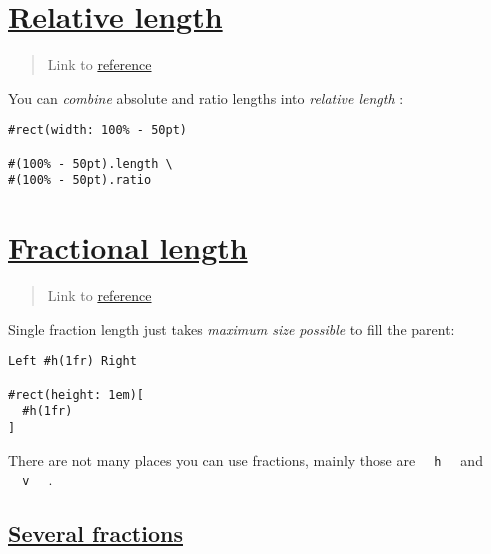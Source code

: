 \section{\texorpdfstring{\hyperref[relative-length]{Relative
length}}{Relative length}}\label{relative-length}

\begin{quote}
Link to
\href{https://typst.app/docs/reference/layout/relative/}{reference}
\end{quote}

You can \emph{combine} absolute and ratio lengths into \emph{relative
length} :

\begin{verbatim}
#rect(width: 100% - 50pt)

#(100% - 50pt).length \
#(100% - 50pt).ratio
\end{verbatim}

\pandocbounded{}

\section{\texorpdfstring{\hyperref[fractional-length]{Fractional
length}}{Fractional length}}\label{fractional-length}

\begin{quote}
Link to
\href{https://typst.app/docs/reference/layout/fraction/}{reference}
\end{quote}

Single fraction length just takes \emph{maximum size possible} to fill
the parent:

\begin{verbatim}
Left #h(1fr) Right

#rect(height: 1em)[
  #h(1fr)
]
\end{verbatim}

\pandocbounded{}

There are not many places you can use fractions, mainly those are
\texttt{\ }{\texttt{\ h\ }}\texttt{\ } and
\texttt{\ }{\texttt{\ v\ }}\texttt{\ } .

\subsection{\texorpdfstring{\hyperref[several-fractions]{Several
fractions}}{Several fractions}}\label{several-fractions}

